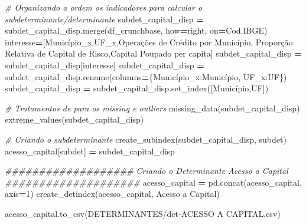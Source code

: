 \documentclass[
  12,
  dvipsnames]{article}
\newenvironment{Shaded}{\begin{snugshade}}{\end{snugshade}}
\newcommand{\CommentTok}[1]{\textcolor[rgb]{0.56,0.35,0.01}{\textit{#1}}}
\newcommand{\DecValTok}[1]{\textcolor[rgb]{0.00,0.00,0.81}{#1}}
\newcommand{\NormalTok}[1]{#1}
\newcommand{\OperatorTok}[1]{\textcolor[rgb]{0.81,0.36,0.00}{\textbf{#1}}}
\newcommand{\StringTok}[1]{\textcolor[rgb]{0.31,0.60,0.02}{#1}}
\begin{document}
\begin{Shaded}
\begin{Highlighting}[]
\CommentTok{\# Organizando a ordem os indicadores para calcular o subdeterminante/determinante}
\NormalTok{subdet\_capital\_disp }\OperatorTok{=}\NormalTok{ subdet\_capital\_disp.merge(df\_crunchbase, how}\OperatorTok{=}\StringTok{\textquotesingle{}right\textquotesingle{}}\NormalTok{, on}\OperatorTok{=}\StringTok{\textquotesingle{}Cod.IBGE\textquotesingle{}}\NormalTok{)}
\NormalTok{interesse}\OperatorTok{=}\NormalTok{[}\StringTok{\textquotesingle{}Município\_x\textquotesingle{}}\NormalTok{,}\StringTok{\textquotesingle{}UF\_x\textquotesingle{}}\NormalTok{,}\StringTok{\textquotesingle{}Operações de Crédito por Município\textquotesingle{}}\NormalTok{,}
           \StringTok{\textquotesingle{}Proporção Relativa de Capital de Risco\textquotesingle{}}\NormalTok{,}\StringTok{\textquotesingle{}Capital Poupado per capita\textquotesingle{}}\NormalTok{]}
\NormalTok{subdet\_capital\_disp }\OperatorTok{=}\NormalTok{ subdet\_capital\_disp[interesse]}
\NormalTok{subdet\_capital\_disp }\OperatorTok{=}\NormalTok{ subdet\_capital\_disp.rename(columns}\OperatorTok{=}\NormalTok{\{}\StringTok{\textquotesingle{}Município\_x\textquotesingle{}}\NormalTok{:}\StringTok{\textquotesingle{}Município\textquotesingle{}}\NormalTok{,}
                                                          \StringTok{\textquotesingle{}UF\_x\textquotesingle{}}\NormalTok{:}\StringTok{\textquotesingle{}UF\textquotesingle{}}\NormalTok{\})}
\NormalTok{subdet\_capital\_disp }\OperatorTok{=}\NormalTok{ subdet\_capital\_disp.set\_index([}\StringTok{\textquotesingle{}Município\textquotesingle{}}\NormalTok{,}\StringTok{\textquotesingle{}UF\textquotesingle{}}\NormalTok{])}

\CommentTok{\# Tratamentos de para os missing e outliers}
\NormalTok{missing\_data(subdet\_capital\_disp)}
\NormalTok{extreme\_values(subdet\_capital\_disp)}

\CommentTok{\# Criando o subdeterminante}
\NormalTok{create\_subindex(subdet\_capital\_disp, subdet)}
\NormalTok{acesso\_capital[subdet] }\OperatorTok{=}\NormalTok{ subdet\_capital\_disp}

\CommentTok{\#\#\#\#\#\#\#\#\#\#\#\#\#\#\#\#\#\#\# Criando o Determinante Acesso a Capital \#\#\#\#\#\#\#\#\#\#\#\#\#\#\#\#\#\#\#\#}
\NormalTok{acesso\_capital }\OperatorTok{=}\NormalTok{ pd.concat(acesso\_capital, axis}\OperatorTok{=}\DecValTok{1}\NormalTok{)}
\NormalTok{create\_detindex(acesso\_capital, }\StringTok{\textquotesingle{}Acesso a Capital\textquotesingle{}}\NormalTok{)}

\NormalTok{acesso\_capital.to\_csv(}\StringTok{\textquotesingle{}DETERMINANTES/det{-}ACESSO A CAPITAL.csv\textquotesingle{}}\NormalTok{)}
\end{Highlighting}
\end{Shaded}
\end{document}

